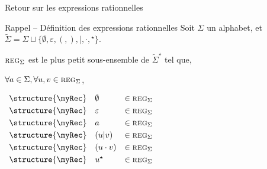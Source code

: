 
\begingroup

\begin{frame}{Retour sur les expressions rationnelles}
  
  \begin{block}{Rappel -- Définition des expressions rationnelles}
    Soit $\Sigma$ un alphabet, et $\tilde{\Sigma} = \Sigma \sqcup \{ \emptyset, \varepsilon, (, ), |, \cdot, {}^\star \}.$

    \alert{$\textsc{reg}_\Sigma$} est le plus petit sous-ensemble de $\tilde{\Sigma}^\star$ tel que, \\

    \vspace{5mm}
    \begin{minipage}{.5\textwidth}
      $\forall a\in \Sigma, \forall u, v \in \textsc{reg}_\Sigma$,

      \vspace{2mm}
      $\begin{array}{lll}
        \vspace{1mm}\structure{\myRec} & \emptyset     & \in \textsc{reg}_\Sigma\\
        \vspace{1mm}\structure{\myRec} & \varepsilon   & \in \textsc{reg}_\Sigma\\
        \vspace{1mm}\structure{\myRec} & a             & \in \textsc{reg}_\Sigma\\
        \vspace{1mm}\structure{\myRec} & ( u | v )     & \in \textsc{reg}_\Sigma\\
        \vspace{1mm}\structure{\myRec} & ( u \cdot v ) & \in \textsc{reg}_\Sigma\\
        \vspace{1mm}\structure{\myRec} & u^\star        & \in \textsc{reg}_\Sigma\\
      \end{array}$
    \end{minipage}%
    \begin{minipage}{.5\textwidth}
      

\end{minipage}
\end{block}
\end{frame}
